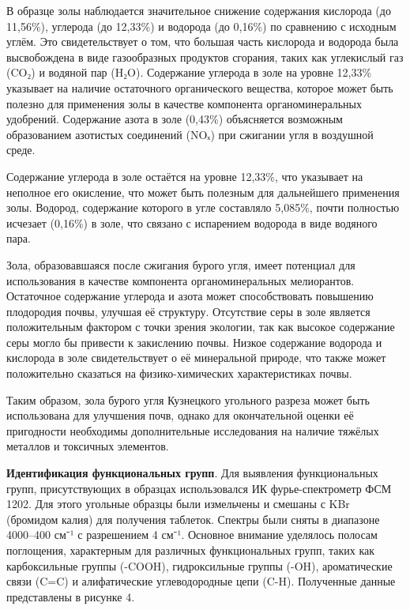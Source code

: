 В образце золы наблюдается значительное снижение содержания кислорода
(до 11,56\%), углерода (до 12,33\%) и водорода (до 0,16\%) по сравнению
с исходным углём. Это свидетельствует о том, что большая часть кислорода
и водорода была высвобождена в виде газообразных продуктов сгорания,
таких как углекислый газ (CO₂) и водяной пар (H₂O). Содержание углерода
в золе на уровне 12,33\% указывает на наличие остаточного органического
вещества, которое может быть полезно для применения золы в качестве
компонента органоминеральных удобрений. Содержание азота в золе (0,43\%)
объясняется возможным образованием азотистых соединений (NOₓ) при
сжигании угля в воздушной среде.

Содержание углерода в золе остаётся на уровне 12,33\%, что указывает на
неполное его окисление, что может быть полезным для дальнейшего
применения золы. Водород, содержание которого в угле составляло 5,085\%,
почти полностью исчезает (0,16\%) в золе, что связано с испарением
водорода в виде водяного пара.

Зола, образовавшаяся после сжигания бурого угля, имеет потенциал для
использования в качестве компонента органоминеральных мелиорантов.
Остаточное содержание углерода и азота может способствовать повышению
плодородия почвы, улучшая её структуру. Отсутствие серы в золе является
положительным фактором с точки зрения экологии, так как высокое
содержание серы могло бы привести к закислению почвы. Низкое содержание
водорода и кислорода в золе свидетельствует о её минеральной природе,
что также может положительно сказаться на физико-химических
характеристиках почвы.

Таким образом, зола бурого угля Кузнецкого угольного разреза может быть
использована для улучшения почв, однако для окончательной оценки её
пригодности необходимы дополнительные исследования на наличие тяжёлых
металлов и токсичных элементов.

{\bfseries Идентификация функциональных групп}. Для выявления
функциональных групп, присутствующих в образцах использовался ИК
фурье-спектрометр ФСМ 1202. Для этого угольные образцы были измельчены и
смешаны с KBr (бромидом калия) для получения таблеток. Спектры были
сняты в диапазоне 4000--400 см⁻¹ с разрешением 4 см⁻¹. Основное внимание
уделялось полосам поглощения, характерным для различных функциональных
групп, таких как карбоксильные группы (-COOH), гидроксильные группы
(-OH), ароматические связи (C=C) и алифатические углеводородные цепи
(C-H). Полученные данные представлены в рисунке 4.

